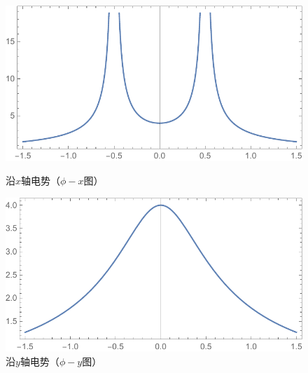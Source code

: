 \begin{figure}[H]
\begin{minipage}[b]{0.4\linewidth}
\centering
\includegraphics[width=\textwidth]{pic_data/T/phix.pdf}
\caption{沿$x$轴电势（$\phi - x$图）}
\end{minipage}
\hfill
\begin{minipage}[b]{0.4\linewidth}
\centering
\includegraphics[width=\textwidth]{pic_data/T/phiy.pdf}
\caption{沿$y$轴电势（$\phi - y$图）}
\end{minipage}
\end{figure}

